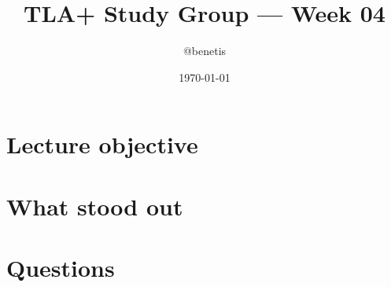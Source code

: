 \documentclass[11pt]{article}
\title{TLA+ Study Group — Week 04}
\author{@benetis}
\date{\today}
\begin{document}
\maketitle

\section*{Lecture objective}

\section*{What stood out}

\section*{Questions}
\end{document}
